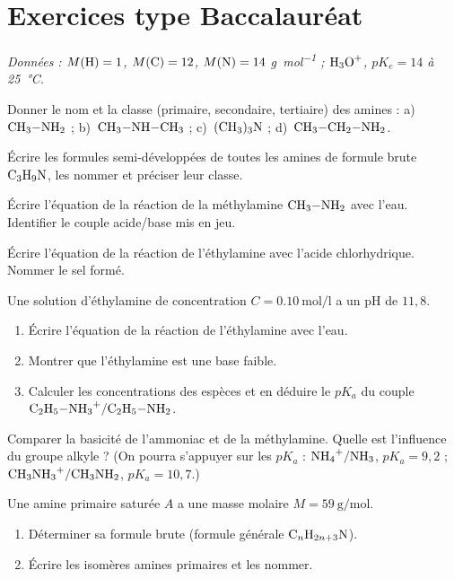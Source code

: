 \section{Exercices type Baccalauréat}
\textit{Données : $M(\ce{H})=1$, $M(\ce{C})=12$, $M(\ce{N})=14$ \si{\gram\per\mol} ;
$\ce{H3O+}$, $pK_e=14$ à \SI{25}{\celsius}.}


\exo{} Donner le nom et la classe (primaire, secondaire, tertiaire) des
amines : a)~$\ce{CH3-NH2}$ ; b)~$\ce{CH3-NH-CH3}$ ; c)~$\ce{(CH3)3N}$ ;
d)~$\ce{CH3-CH2-NH2}$.

\exo{} Écrire les formules semi-développées de toutes les amines de formule
brute $\ce{C3H9N}$, les nommer et préciser leur classe.


\exo{} Écrire l'équation de la réaction de la méthylamine $\ce{CH3-NH2}$
avec l'eau. Identifier le couple acide/base mis en jeu.

\exo{} Écrire l'équation de la réaction de l'éthylamine avec l'acide
chlorhydrique. Nommer le sel formé.

\exo{} Une solution d'éthylamine de concentration
$C = \SI{0.10}{\mol\per\litre}$ a un pH de $11{,}8$.
\begin{enumerate}[label=\arabic*)]
\item Écrire l'équation de la réaction de l'éthylamine avec l'eau.
\item Montrer que l'éthylamine est une base faible.
\item Calculer les concentrations des espèces et en déduire le $pK_a$ du couple
$\ce{C2H5-NH3+}/\ce{C2H5-NH2}$.
\end{enumerate}

\exo{} Comparer la basicité de l'ammoniac et de la méthylamine. Quelle est
l'influence du groupe alkyle ? (On pourra s'appuyer sur les $pK_a$ : $\ce{NH4+}/\ce{NH3}$,
$pK_a = 9{,}2$ ; $\ce{CH3NH3+}/\ce{CH3NH2}$, $pK_a = 10{,}7$.)


\exo{} Une amine primaire saturée $A$ a une masse molaire
$M = \SI{59}{\gram\per\mol}$.
\begin{enumerate}[label=\arabic*)]
\item Déterminer sa formule brute (formule générale $\ce{C_nH_{2n+3}N}$).
\item Écrire les isomères amines primaires et les nommer.
\end{enumerate}

